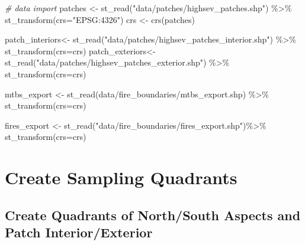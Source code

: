 \documentclass[
]{book}
\newenvironment{Shaded}{\begin{snugshade}}{\end{snugshade}}
\newcommand{\AttributeTok}[1]{\textcolor[rgb]{0.77,0.63,0.00}{#1}}
\newcommand{\CommentTok}[1]{\textcolor[rgb]{0.56,0.35,0.01}{\textit{#1}}}
\newcommand{\FunctionTok}[1]{\textcolor[rgb]{0.00,0.00,0.00}{#1}}
\newcommand{\NormalTok}[1]{#1}
\newcommand{\OtherTok}[1]{\textcolor[rgb]{0.56,0.35,0.01}{#1}}
\newcommand{\SpecialCharTok}[1]{\textcolor[rgb]{0.00,0.00,0.00}{#1}}
\newcommand{\StringTok}[1]{\textcolor[rgb]{0.31,0.60,0.02}{#1}}
\begin{document}
\begin{Shaded}
\begin{Highlighting}[]
\CommentTok{\# data import}
\NormalTok{patches }\OtherTok{\textless{}{-}} \FunctionTok{st\_read}\NormalTok{(}\StringTok{"data/patches/highsev\_patches.shp"}\NormalTok{) }\SpecialCharTok{\%\textgreater{}\%} 
  \FunctionTok{st\_transform}\NormalTok{(}\AttributeTok{crs=}\StringTok{"EPSG:4326"}\NormalTok{)}
\NormalTok{crs }\OtherTok{\textless{}{-}} \FunctionTok{crs}\NormalTok{(patches)}

\NormalTok{patch\_interiors}\OtherTok{\textless{}{-}} \FunctionTok{st\_read}\NormalTok{(}\StringTok{"data/patches/highsev\_patches\_interior.shp"}\NormalTok{) }\SpecialCharTok{\%\textgreater{}\%}
  \FunctionTok{st\_transform}\NormalTok{(}\AttributeTok{crs=}\NormalTok{crs)}
\NormalTok{patch\_exteriors}\OtherTok{\textless{}{-}} \FunctionTok{st\_read}\NormalTok{(}\StringTok{"data/patches/highsev\_patches\_exterior.shp"}\NormalTok{) }\SpecialCharTok{\%\textgreater{}\%}
  \FunctionTok{st\_transform}\NormalTok{(}\AttributeTok{crs=}\NormalTok{crs)}

\NormalTok{mtbs\_export }\OtherTok{\textless{}{-}} \FunctionTok{st\_read}\NormalTok{(}\StringTok{\textquotesingle{}data/fire\_boundaries/mtbs\_export.shp\textquotesingle{}}\NormalTok{) }\SpecialCharTok{\%\textgreater{}\%} 
  \FunctionTok{st\_transform}\NormalTok{(}\AttributeTok{crs=}\NormalTok{crs) }

\NormalTok{fires\_export }\OtherTok{\textless{}{-}} \FunctionTok{st\_read}\NormalTok{(}\StringTok{"data/fire\_boundaries/fires\_export.shp"}\NormalTok{)}\SpecialCharTok{\%\textgreater{}\%} 
  \FunctionTok{st\_transform}\NormalTok{(}\AttributeTok{crs=}\NormalTok{crs)}
\end{Highlighting}
\end{Shaded}

\hypertarget{create-sampling-quadrants}{%
\chapter{Create Sampling Quadrants}\label{create-sampling-quadrants}}

\hypertarget{create-quadrants-of-northsouth-aspects-and-patch-interiorexterior}{%
\section{Create Quadrants of North/South Aspects and Patch Interior/Exterior}\label{create-quadrants-of-northsouth-aspects-and-patch-interiorexterior}}
\end{document}
